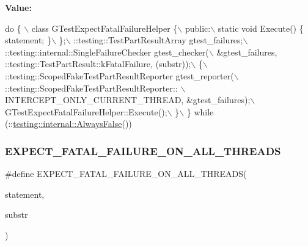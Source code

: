 {\bfseries Value\+:}
\begin{DoxyCode}
\textcolor{keywordflow}{do} \{ \(\backslash\)
    class GTestExpectFatalFailureHelper \{\(\backslash\)
     public:\(\backslash\)
      static \textcolor{keywordtype}{void} Execute() \{ statement; \}\(\backslash\)
    \};\(\backslash\)
    ::testing::TestPartResultArray gtest\_failures;\(\backslash\)
    ::testing::internal::SingleFailureChecker gtest\_checker(\(\backslash\)
        &gtest\_failures, ::testing::TestPartResult::kFatalFailure, (substr));\(\backslash\)
    \{\(\backslash\)
      ::testing::ScopedFakeTestPartResultReporter gtest\_reporter(\(\backslash\)
          ::testing::ScopedFakeTestPartResultReporter:: \(\backslash\)
          INTERCEPT\_ONLY\_CURRENT\_THREAD, &gtest\_failures);\(\backslash\)
      GTestExpectFatalFailureHelper::Execute();\(\backslash\)
    \}\(\backslash\)
  \} \textcolor{keywordflow}{while} (::\hyperlink{namespacetesting_1_1internal_a4b24c851ab13569b1b15b3d259b60d2e}{testing::internal::AlwaysFalse}())
\end{DoxyCode}
\mbox{\label{gtest-spi_8h_ad8aac5bc859b2ddc07583636ae4f45cf}} 
\subsubsection{\texorpdfstring{E\+X\+P\+E\+C\+T\+\_\+\+F\+A\+T\+A\+L\+\_\+\+F\+A\+I\+L\+U\+R\+E\+\_\+\+O\+N\+\_\+\+A\+L\+L\+\_\+\+T\+H\+R\+E\+A\+DS}{EXPECT\_FATAL\_FAILURE\_ON\_ALL\_THREADS}}
{\footnotesize\ttfamily \#define E\+X\+P\+E\+C\+T\+\_\+\+F\+A\+T\+A\+L\+\_\+\+F\+A\+I\+L\+U\+R\+E\+\_\+\+O\+N\+\_\+\+A\+L\+L\+\_\+\+T\+H\+R\+E\+A\+DS(\begin{DoxyParamCaption}\item[{}]{statement,  }\item[{}]{substr }\end{DoxyParamCaption})}

